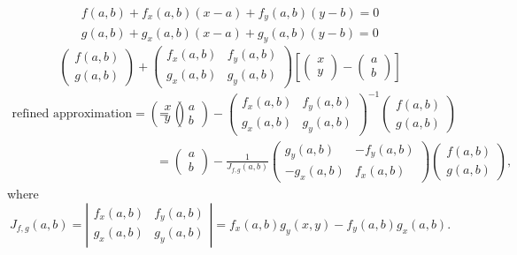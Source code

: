 \documentclass[12pt]{amsart}
\begin{document}
\begin{align*}
    f(a,b) + f_x(a,b)(x-a) + f_y(a,b)(y-b)= 0\\
    g(a,b) + g_x(a,b)(x-a) + g_y(a,b)(y-b)= 0
\end{align*}
\[
    \begin{pmatrix}
        f(a,b)\\g(a,b)
    \end{pmatrix}
    + \begin{pmatrix}
        f_x(a,b)&f_y(a,b)\\g_x(a,b)&g_y(a,b)
    \end{pmatrix}
    \left[\begin{pmatrix}
        x\\y
    \end{pmatrix}
    -\begin{pmatrix}
        a\\b
    \end{pmatrix}\right]
\]
\begin{align*}
    \text{refined approximation} = \begin{pmatrix}
        x\\y
    \end{pmatrix}
    &= \begin{pmatrix}
        a\\b
    \end{pmatrix}
    - \begin{pmatrix}
        f_x(a,b)&f_y(a,b)\\g_x(a,b)&g_y(a,b)
    \end{pmatrix}^{-1}
    \begin{pmatrix}
        f(a,b)\\g(a,b)
    \end{pmatrix}\\
    &= \begin{pmatrix}
        a\\b
    \end{pmatrix}
    - \frac1{J_{f,g}(a,b)}
    \begin{pmatrix}
        g_y(a,b)&-f_y(a,b)\\-g_x(a,b)&f_x(a,b)
    \end{pmatrix}
    \begin{pmatrix}
        f(a,b)\\g(a,b)
    \end{pmatrix},
\end{align*}
where
\[
    J_{f,g}(a,b) = \left|\begin{matrix}
        f_x(a,b)&f_y(a,b)\\g_x(a,b)&g_y(a,b)
    \end{matrix}\right|
    = f_x(a,b)g_y(x,y) - f_y(a,b)g_x(a,b).
\]
\end{document}
